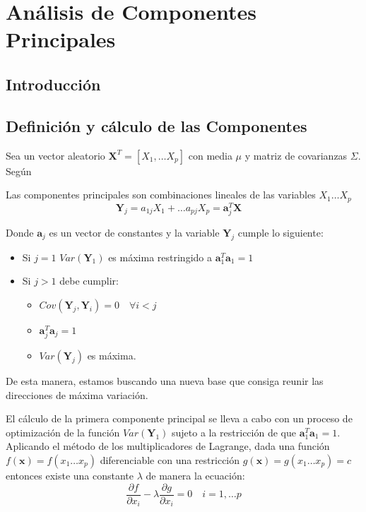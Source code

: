 \chapter{Análisis de Componentes Principales}
\section{Introducción}

%

\section{Definición y cálculo de las Componentes}

\noindent Sea un vector aleatorio $\textbf{X}^T=[X_1,\ldots X_p]$ con media $\mu$ y matriz de covarianzas $\Sigma$. Según
\begin{defi}
Las componentes principales son combinaciones lineales de las variables $X_1 \ldots X_p$
\begin{equation}
\textbf{Y}_j=a_{1j}X_1+\ldots a_{pj}X_p=\textbf{a}_j^T\textbf{X}\quad 
\end{equation}

\noindent Donde $\textbf{a}_j$ es un vector de constantes y la variable $\textbf{Y}_j$ cumple lo siguiente:
\begin{itemize}
\item Si $j=1$ $Var(\textbf{Y}_1)$ es máxima restringido a $\textbf{a}_1^T \textbf{a}_1=1$
\item Si $j>1$ debe cumplir:
\begin{itemize}
\item $Cov(\textbf{Y}_j,\textbf{Y}_i)=0\quad \forall i<j $
\item $\textbf{a}_j^T \textbf{a}_j=1$
\item $Var(\textbf{Y}_j)$ es máxima. 
\end{itemize}

\end{itemize}

De esta manera, estamos buscando una nueva base que consiga reunir las direcciones de máxima variación. 
\end{defi}

\noindent El cálculo de la primera componente principal se lleva a cabo con un proceso de optimización de la función $Var(\textbf{Y}_1)$ sujeto a la restricción de que $\textbf{a}_1^T\textbf{a}_1=1$. Aplicando el método de los multiplicadores de Lagrange,  dada una función $f(\textbf{x})=f(x_1\ldots x_p)$ diferenciable con una restricción $g(\textbf{x})=g(x_1\ldots x_p)=c$ entonces existe una constante $\lambda$ de manera la ecuación:
\begin{equation}
\dfrac{\partial f}{\partial x_i}-\lambda\dfrac{\partial g}{\partial x_i}=0 \quad i=1,\ldots p 
\end{equation}

